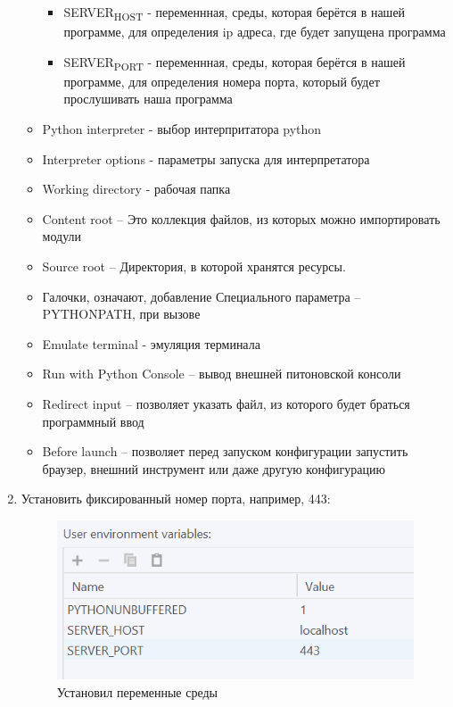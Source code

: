 \documentclass[14pt]{extarticle}
\begin{document}
\begin{enumerate}
\begin{itemize}
\begin{itemize}
\item SERVER\textsubscript{HOST} - переменнная, среды, которая берётся в нашей программе,
для определения ip адреса, где будет запущена программа

\item SERVER\textsubscript{PORT} - переменнная, среды, которая берётся в нашей программе,
для определения номера порта, который будет прослушивать наша программа
\end{itemize}

\item Python interpreter - выбор интерпритатора python

\item Interpreter options - параметры запуска для интерпретатора

\item Working directory - рабочая папка

\item Content root – Это коллекция файлов, из которых можно импортировать модули

\item Source root – Директория, в которой хранятся ресурсы.

\item Галочки, означают, добавление Специального параметра – PYTHONPATH, при вызове

\item Emulate terminal - эмуляция терминала

\item Run with Python Console – вывод внешней питоновской консоли

\item Redirect input – позволяет указать файл, из которого будет браться программный ввод

\item Before launch – позволяет перед запуском конфигурации запустить браузер, внешний инструмент или даже другую конфигурацию
\end{itemize}
\item Установить фиксированный номер порта, например, 443:
\begin{figure}[H]
\centering
\includegraphics[width=.9\linewidth]{images/2023-04-12_09-55-16_screenshot.png}
\caption{Установил переменные среды}
\end{figure}


\end{enumerate}
\end{document}
